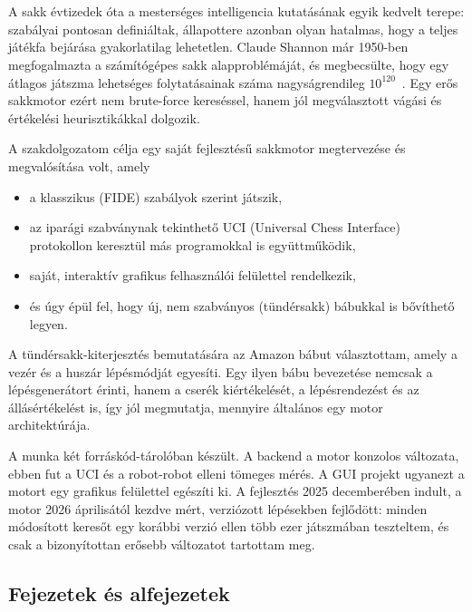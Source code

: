 \chapter{\bevezetes}

A sakk évtizedek óta a mesterséges intelligencia kutatásának egyik kedvelt terepe: szabályai pontosan definiáltak, állapottere azonban olyan hatalmas, hogy a teljes játékfa bejárása gyakorlatilag lehetetlen. Claude Shannon már 1950-ben megfogalmazta a számítógépes sakk alapproblémáját, és megbecsülte, hogy egy átlagos játszma lehetséges folytatásainak száma nagyságrendileg $10^{120}$~\cite{Shannon50}. Egy erős sakkmotor ezért nem brute-force kereséssel, hanem jól megválasztott vágási és értékelési heurisztikákkal dolgozik.

A szakdolgozatom célja egy saját fejlesztésű sakkmotor megtervezése és megvalósítása volt, amely
\begin{itemize}
	\item a klasszikus (FIDE) szabályok szerint játszik,
	\item az iparági szabványnak tekinthető UCI (Universal Chess Interface) protokollon keresztül más programokkal is együttműködik,
	\item saját, interaktív grafikus felhasználói felülettel rendelkezik,
	\item és úgy épül fel, hogy új, nem szabványos (tündérsakk) bábukkal is bővíthető legyen.
\end{itemize}

A tündérsakk-kiterjesztés bemutatására az Amazon bábut választottam, amely a vezér és a huszár lépésmódját egyesíti. Egy ilyen bábu bevezetése nemcsak a lépésgenerátort érinti, hanem a cserék kiértékelését, a lépésrendezést és az állásértékelést is, így jól megmutatja, mennyire általános egy motor architektúrája.

A munka két forráskód-tárolóban készült. A backend a motor konzolos változata, ebben fut a UCI és a robot-robot elleni tömeges mérés. A GUI projekt ugyanezt a motort egy grafikus felülettel egészíti ki. A fejlesztés 2025 decemberében indult, a motor 2026 áprilisától kezdve mért, verziózott lépésekben fejlődött: minden módosított keresőt egy korábbi verzió ellen több ezer játszmában teszteltem, és csak a bizonyítottan erősebb változatot tartottam meg.

\section*{Fejezetek és alfejezetek}


